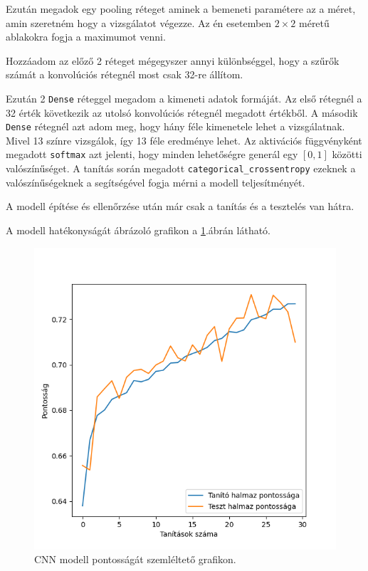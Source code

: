 Ezután megadok egy pooling réteget aminek a bemeneti paramétere az a méret, amin szeretném hogy a vizsgálatot végezze. Az én esetemben $2 \times 2$ méretű ablakokra fogja a maximumot venni.

Hozzáadom az előző 2 réteget mégegyszer annyi különbséggel, hogy a szűrők számát a konvolúciós rétegnél most csak 32-re állítom.

Ezután 2 \texttt{Dense} réteggel megadom a kimeneti adatok formáját. Az első rétegnél a 32 érték következik az utolsó konvolúciós rétegnél megadott értékből. A második \texttt{Dense} rétegnél azt adom meg, hogy hány féle kimenetele lehet a vizsgálatnak. Mivel 13 színre vizsgálok, így 13 féle eredménye lehet. Az aktivációs függvényként megadott \texttt{softmax} azt jelenti, hogy minden lehetőségre generál egy $[0, 1]$ közötti valószínűséget. A tanítás során megadott \texttt{categorical\_crossentropy} ezeknek a valószínűségeknek a segítségével fogja mérni a modell teljesítményét.

A modell építése és ellenőrzése után már csak a tanítás és a tesztelés van hátra.


A modell hatékonyságát ábrázoló grafikon a \ref{fig:cnn_accuracy}.ábrán látható.

\begin{figure}[h]
\centering
\includegraphics[scale=0.7]{images/cnn_accuracy.png}
\caption{CNN modell pontosságát szemléltető grafikon.}
\label{fig:cnn_accuracy}
\end{figure}

